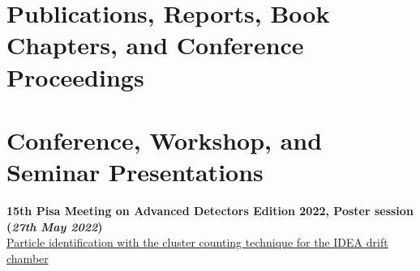 \documentclass[11pt]{res}
\newcommand{\MarginText}[1]{\section{#1}\vspace{10pt}}
\begin{document}
\begin{resume}

\MarginText{Publications, Reports, Book Chapters, and Conference Proceedings}

\nocite{*}


\vspace{10pt}
\printbibliography[heading=none,sorting=ynt]









\MarginText{Conference, Workshop, and Seminar Presentations}

\textbf{15th Pisa Meeting on Advanced Detectors Edition 2022, Poster session} \textbf{(\textit{27th May 2022})}\\ 
\href{https://agenda.infn.it/event/22092/contributions/166630/}{Particle identification with the cluster counting technique for the IDEA drift chamber}


\end{resume}
\end{document}
